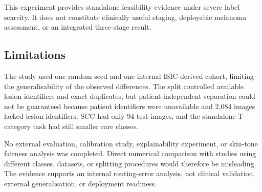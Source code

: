 This experiment provides standalone feasibility evidence under severe label
scarcity. It does not constitute clinically useful staging, deployable
melanoma assessment, or an integrated three-stage result.

\subsection{Limitations}

The study used one random seed and one internal ISIC-derived cohort, limiting
the generalisability of the observed differences. The split controlled
available lesion identifiers and exact duplicates, but patient-independent
separation could not be guaranteed because patient identifiers were
unavailable and 2,084 images lacked lesion identifiers. SCC had only 94 test
images, and the standalone T-category task had still smaller rare classes.

No external evaluation, calibration study, explainability experiment, or
skin-tone fairness analysis was completed. Direct numerical comparison with
studies using different classes, datasets, or splitting procedures would
therefore be misleading. The evidence supports an internal routing-error
analysis, not clinical validation, external generalisation, or deployment
readiness.
